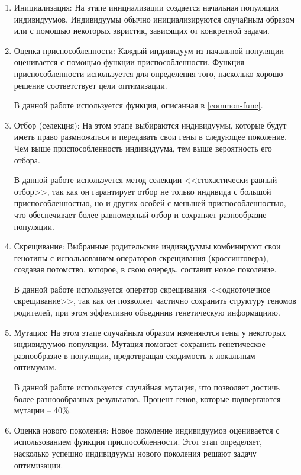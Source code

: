 \documentclass[12pt]{report}
\begin{document}
\begin{enumerate}
    \item Инициализация: На этапе инициализации создается начальная популяция индивидуумов. 
    Индивидуумы обычно инициализируются случайным образом или с помощью некоторых эвристик, зависящих от конкретной задачи.

    \item Оценка приспособленности:
   Каждый индивидуум из начальной популяции оценивается с помощью функции приспособленности. 
   Функция приспособленности используется для определения того, насколько хорошо решение соответствует цели оптимизации. 
   
   В данной работе используется функция, описанная в \ref{common-func}.

    \item Отбор (селекция):
   На этом этапе выбираются индивидуумы, которые будут иметь право размножаться и передавать свои гены в следующее поколение. 
   Чем выше приспособленность индивидуума, тем выше вероятность его отбора. 
   
   В данной работе используется метод селекции <<стохастически равный отбор>>, так как он гарантирует отбор не только индивида с большой приспособленностью, но и других особей с меньшей приспособленностью, что обеспечивает более равномерный отбор и сохраняет разнообразие популяции.
   
   \item Скрещивание:
   Выбранные родительские индивидуумы комбинируют свои генотипы с использованием операторов скрещивания (кроссинговера), создавая потомство, которое, в свою очередь, составит новое поколение.

   В данной работе используется оператор скрещивания <<одноточечное скрещивание>>, так как он позволяет частично сохранить структуру геномов родителей, при этом эффективно объединив генетическую информациию.

   \item Мутация:
   На этом этапе случайным образом изменяются гены у некоторых индивидуумов популяции. 
   Мутация помогает сохранить генетическое разнообразие в популяции, предотвращая сходимость к локальным оптимумам.

   В данной работе используется случайная мутация, что позволяет достичь более разноообразных результатов. 
   Процент генов, которые подвергаются мутации -- 40\%.

   \item Оценка нового поколения:
   Новое поколение индивидуумов оценивается с использованием функции приспособленности. 
   Этот этап определяет, насколько успешно индивидуумы нового поколения решают задачу оптимизации.


\end{enumerate}
\end{document}
